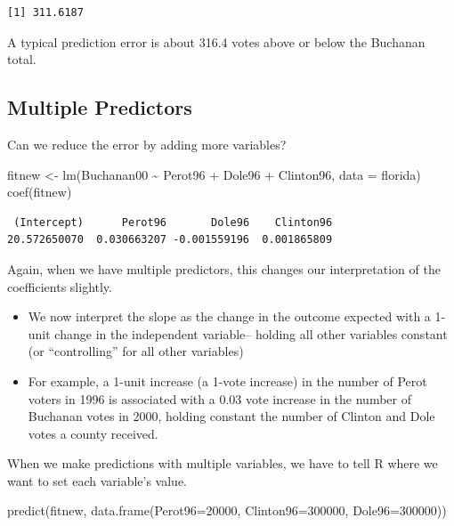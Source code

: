 \documentclass[
  letterpaper,
  DIV=11,
  numbers=noendperiod]{scrreprt}
\newenvironment{Shaded}{\begin{snugshade}}{\end{snugshade}}
\newcommand{\AttributeTok}[1]{\textcolor[rgb]{0.40,0.45,0.13}{#1}}
\newcommand{\DecValTok}[1]{\textcolor[rgb]{0.68,0.00,0.00}{#1}}
\newcommand{\FunctionTok}[1]{\textcolor[rgb]{0.28,0.35,0.67}{#1}}
\newcommand{\NormalTok}[1]{\textcolor[rgb]{0.00,0.23,0.31}{#1}}
\newcommand{\OtherTok}[1]{\textcolor[rgb]{0.00,0.23,0.31}{#1}}
\newcommand{\SpecialCharTok}[1]{\textcolor[rgb]{0.37,0.37,0.37}{#1}}
\providecommand{\tightlist}{%
  \setlength{\itemsep}{0pt}\setlength{\parskip}{0pt}}\usepackage{longtable,booktabs,array}
\begin{document}
\begin{verbatim}
[1] 311.6187
\end{verbatim}

A typical prediction error is about 316.4 votes above or below the
Buchanan total.

\hypertarget{multiple-predictors}{%
\subsection{Multiple Predictors}\label{multiple-predictors}}

Can we reduce the error by adding more variables?

\begin{Shaded}
\begin{Highlighting}[]
\NormalTok{fitnew }\OtherTok{\textless{}{-}} \FunctionTok{lm}\NormalTok{(Buchanan00 }\SpecialCharTok{\textasciitilde{}}\NormalTok{ Perot96 }\SpecialCharTok{+}\NormalTok{ Dole96 }\SpecialCharTok{+}\NormalTok{ Clinton96, }\AttributeTok{data =}\NormalTok{ florida)}
\FunctionTok{coef}\NormalTok{(fitnew)}
\end{Highlighting}
\end{Shaded}

\begin{verbatim}
 (Intercept)      Perot96       Dole96    Clinton96 
20.572650070  0.030663207 -0.001559196  0.001865809 
\end{verbatim}

Again, when we have multiple predictors, this changes our interpretation
of the coefficients slightly.

\begin{itemize}
\tightlist
\item
  We now interpret the slope as the change in the outcome expected with
  a 1-unit change in the independent variable-- holding all other
  variables constant (or ``controlling'' for all other variables)
\item
  For example, a 1-unit increase (a 1-vote increase) in the number of
  Perot voters in 1996 is associated with a 0.03 vote increase in the
  number of Buchanan votes in 2000, holding constant the number of
  Clinton and Dole votes a county received.
\end{itemize}

When we make predictions with multiple variables, we have to tell R
where we want to set each variable's value.

\begin{Shaded}
\begin{Highlighting}[]
\FunctionTok{predict}\NormalTok{(fitnew, }\FunctionTok{data.frame}\NormalTok{(}\AttributeTok{Perot96=}\DecValTok{20000}\NormalTok{, }\AttributeTok{Clinton96=}\DecValTok{300000}\NormalTok{, }\AttributeTok{Dole96=}\DecValTok{300000}\NormalTok{))}
\end{Highlighting}
\end{Shaded}
\end{document}
